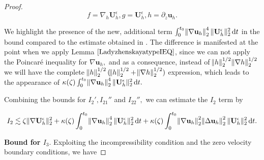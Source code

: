 \documentclass[11pt]{article}
\newcommand*\diff{\mathop{}\!\mathrm{d}}
\begin{document}
\begin{proof}
$$f = \nabla_h \mathbf{U}_h^\epsilon, g = \mathbf{U}_h^\epsilon, h = \partial_z \mathbf{u}_h.$$

We highlight the presence of the new, additional term $\int_0^{t_0} \norm{\nabla \mathbf{u}_h}_2^4 \| \mathbf{U}_h^\epsilon \| _2^2 \diff t$ in the bound compared to the estimate obtained in \cite{li2019primitive}. The difference is manifested at the point when we apply Lemma $\ref{LadyzhenskayatypeIEQ}$, since we can not apply the Poincar\'e inequality for $\nabla \mathbf{u}_h,$ and as a consequence, instead of $\norm{h}_2^{1/2} \norm{\nabla h}_2^{1/2}$ we will have the complete $\norm{h}_2^{1/2} (\norm{h}_2^{1/2} + \norm{\nabla h}_2^{1/2})$ expression, which leads to the appearance of $\kappa(\zeta) \int_0^{t_0} \norm{\nabla \mathbf{u}_h}_2^4 \| \mathbf{U}_h^\epsilon \|_2^2 \diff t.$

Combining the bounds for $I_2', I_{21}''$ and $I_{22}'',$ we can estimate the $I_2$ term by

$$ I_2 \lesssim \zeta \| \nabla \mathbf{U}_h^\epsilon \| ^2_2 + \kappa(\zeta) \int_0^{t_0} \norm{\nabla \mathbf{u}_h}_2^4 \| \mathbf{U}_h^\epsilon \| _2^2 \diff t + \kappa(\zeta) \int_0^{t_0} \norm{\nabla \mathbf{u}_h}_2^2 \norm{\Delta \mathbf{u}_h}_2^2 \| \mathbf{U}_h^\epsilon \| _2^2 \diff t. $$

\textbf{Bound for $I_3.$} Exploiting the incompressibility condition and the zero velocity boundary conditions, we have


\end{proof}
\end{document}
